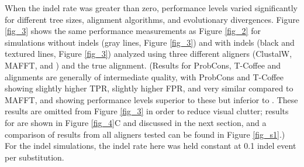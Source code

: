 When the indel rate was greater than zero, performance levels varied
significantly for different tree sizes, alignment algorithms, and
evolutionary divergences. Figure \ref{fig_3} shows the same
performance measurements as Figure \ref{fig_2} for simulations without
indels (gray lines, Figure \ref{fig_3}) and with indels (black and
textured lines, Figure \ref{fig_3}) analyzed using three different
aligners (ClustalW, MAFFT, and \prankc) and the true
alignment. (Results for ProbCons, T-Coffee and \pranka
  alignments are generally of intermediate quality, with ProbCons and
  T-Coffee showing slightly higher TPR, slightly higher FPR, and very
  similar \tpr{} compared to MAFFT, and \pranka showing performance
  levels superior to these but inferior to \prankc. These results are
  omitted from Figure \ref{fig_3} in order to reduce visual clutter;
  \tpr results for \pranka are shown in Figure \ref{fig_4}C and
  discussed in the next section, and a comparison of results from all
  aligners tested can be found in Figure \ref{fig_s1}.) For the
indel simulations, the indel rate here was held constant at 0.1 indel
event per substitution.
